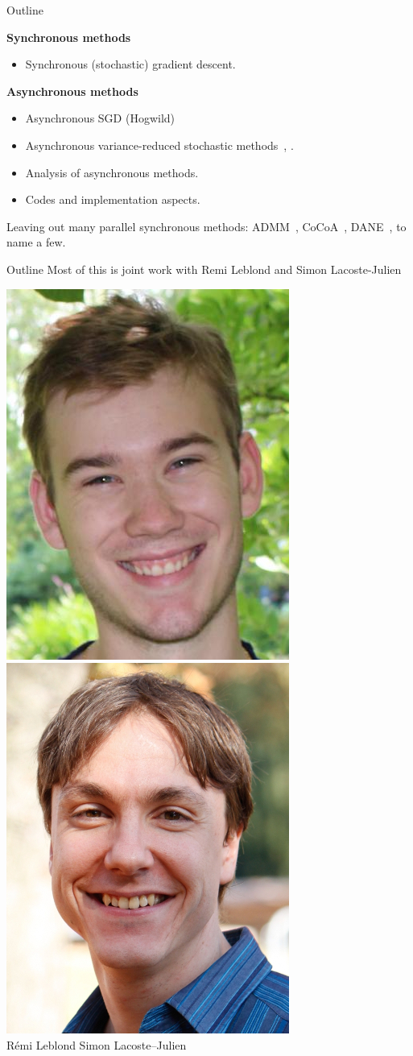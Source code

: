 \documentclass[10pt]{beamer}
\let\oldparencite=\parencite
\renewcommand{\parencite}[1]{\textcolor[rgb]{.7,.7,.7}{\oldparencite{#1}}}
\begin{document}
\begin{frame}{Outline}

{\centering \bfseries Synchronous methods}
\begin{itemize}
\item Synchronous (stochastic) gradient descent.
\end{itemize}
{\centering \bfseries Asynchronous methods}
\begin{itemize}
\item Asynchronous SGD (Hogwild)~\parencite{hogwild2011}
\item Asynchronous variance-reduced stochastic methods~\parencite{leblond2016Asaga}, \parencite{pedregosa2017proxasaga}.
\item Analysis of asynchronous methods. 
\item Codes and implementation aspects.
\end{itemize}

Leaving out many parallel synchronous methods: ADMM~\parencite{glowinski1975approximation}, CoCoA~\parencite{NIPS2014_5599}, DANE~\parencite{shamir2014communication}, to name a few.

\end{frame}

\begin{frame}{Outline}
Most of this is joint work with Remi Leblond and Simon Lacoste-Julien

{
\hspace{4.8em}\includegraphics[width=0.2\linewidth]{img/remi}
\hspace{4.8em}\includegraphics[width=0.2\linewidth]{img/SLJ}
}\\
{\normalsize\vphantom{}
\hspace{4em} R\'emi Leblond \hspace{3em} Simon Lacoste--Julien}\\

\end{frame}
\end{document}
